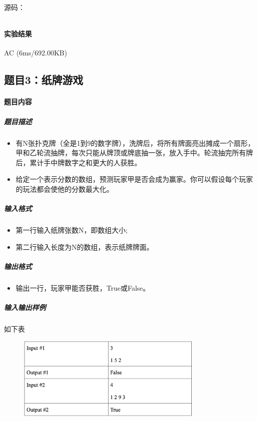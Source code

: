 \documentclass[12pt,a4paper]{ctexart}
\begin{document}
源码：
\inputminted[bgcolor=codebg,frame=lines,autogobble,linenos=true,breaklines]{cpp}{src/t1.cpp}

\vspace{5pt}

\paragraph{实验结果}AC (6ms/692.00KB)

\vspace{5pt}


\subsection*{题目3：纸牌游戏}
\paragraph{题目内容}
\subparagraph{题目描述}

\begin{itemize}
    \item 有N张扑克牌（全是1到9的数字牌），洗牌后，将所有牌面亮出摊成一个扇形，甲和乙轮流抽牌，每次只能从牌顶或牌底抽一张，放入手中。轮流抽完所有牌后，累计手中牌数字之和更大的人获胜。
    \item 给定一个表示分数的数组，预测玩家甲是否会成为赢家。你可以假设每个玩家的玩法都会使他的分数最大化。
\end{itemize}

\subparagraph{输入格式}
    \begin{itemize}
        \item 第一行输入纸牌张数N，即数组大小;
        \item 第二行输入长度为N的数组，表示纸牌牌面。
    \end{itemize}

\subparagraph{输出格式}
    \begin{itemize}
        \item 输出一行，玩家甲能否获胜，True或False。
    \end{itemize}
    

\subparagraph{输入输出样例}
如下表
    \begin{figure}[h]
        \centering
        \includegraphics[width=0.80\textwidth]{q3_iodata.png}
    \end{figure}
\end{document}
